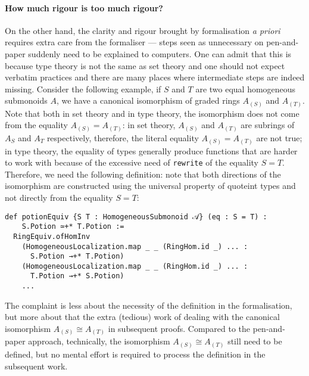 \documentclass[graybox]{svmult}
\begin{document}
\paragraph{How much rigour is too much rigour?}%
On the other hand, the clarity and rigour brought by formalisation \textit{a priori} requires extra 
care from the formaliser --- steps seen as unnecessary on pen-and-paper suddenly need to 
be explained to computers. One can admit that this is because type theory is not the same as set theory and 
one should not expect verbatim practices and there are many places where intermediate steps are indeed missing.
Consider the following example, if $S$ and $T$ are two equal homogeneous submonoids $A$, we have a canonical isomorphism of graded rings
$A_{(S)}$ and $A_{(T)}$. 
Note that both in set theory and in type theory, the isomorphism does not come from the equality $A_{(S)} = A_{(T)}$:
in set theory, $A_{(S)}$ and $A_{(T)}$ are subrings of $A_S$ and $A_T$ respectively,  
therefore, the literal equality $A_{(S)} = A_{(T)}$ are not true; 
in type theory, the equality of types generally produce functions that are harder to work with because of the excessive need of \lstinline|rewrite| of the equality $S = T$.
Therefore, we need the following definition: note that both directions of the isomorphism are constructed
using the universal property of quoteint types and not directly from the equality $S = T$:
\begin{lstlisting}
def potionEquiv {S T : HomogeneousSubmonoid 𝒜} (eq : S = T) : 
    S.Potion ≃+* T.Potion := 
  RingEquiv.ofHomInv
    (HomogeneousLocalization.map _ _ (RingHom.id _) ... : 
      S.Potion →+* T.Potion)
    (HomogeneousLocalization.map _ _ (RingHom.id _) ... : 
      T.Potion →+* S.Potion)
    ...
\end{lstlisting}
The complaint is less about the necessity of the definition in the formalisation, but more about that 
the extra (tedious) work of dealing with the canonical isomorphism $A_{(S)} \cong A_{(T)}$ in subsequent proofs.
Compared to the pen-and-paper approach, technically, the isomorphism $A_{(S)} \cong A_{(T)}$ still need to be defined, 
but no mental effort is required to process the definition in the subsequent work.
\end{document}
